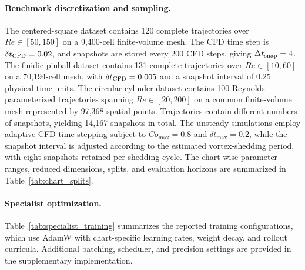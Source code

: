 \documentclass{article}
\begin{document}
\paragraph{Benchmark discretization and sampling.}
The centered-square dataset contains 120 complete trajectories over
$Re\in[50,150]$ on a 9,400-cell finite-volume mesh. The CFD time step is $\delta t_{\rm CFD}=0.02$, and snapshots are stored every 200 CFD steps, giving $\Delta t_{\rm snap}=4$. The fluidic-pinball dataset contains 131 complete trajectories over $Re\in[10,60]$ on a 70,194-cell mesh, with $\delta t_{\rm CFD}=0.005$ and a snapshot interval of $0.25$ physical time units. The circular-cylinder dataset contains 100 Reynolds-parameterized trajectories spanning
$Re\in[20,200]$ on a common finite-volume mesh represented by 97,368 spatial points. Trajectories contain different numbers of snapshots, yielding 14,167 snapshots in total. The unsteady simulations employ adaptive CFD time stepping subject to $Co_{\max}=0.8$ and $\delta t_{\max}=0.2$, while the snapshot interval is adjusted according to the estimated vortex-shedding period, with eight snapshots retained per shedding cycle. The chart-wise parameter ranges, reduced dimensions, splits, and evaluation horizons are summarized in Table~\ref{tab:chart_splits}.


\paragraph{Specialist optimization.}
Table~\ref{tab:specialist_training} summarizes the reported training configurations, which use AdamW with chart-specific learning rates, weight decay, and rollout curricula.
Additional batching, scheduler, and precision settings are provided in the supplementary implementation.
\end{document}
